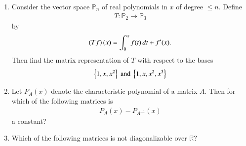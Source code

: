 \renewcommand{\theequation}{\theenumi}
\renewcommand{\thefigure}{\theenumi}
\begin{enumerate}[label=\thesection.\arabic*.,ref=\thesection.\theenumi]


\item Consider the vector space $\mathbb{P}_n$  of real polynomials in $x$ of degree  $\le n$. Define
\begin{align}
T: \mathbb{P}_2 \to \mathbb{P}_3
\end{align}
by
\begin{align}
\left(Tf\right)(x) = \int_{0}^{x}f(t)\,dt + f^{\prime}(x).
\end{align}
%
Then find the matrix representation of $T$ with respect to the bases
\begin{align}
\left\{1,x,x^2\right\} \text{ and } \left\{1,x,x^2,x^3\right\}
\end{align}
%
\item Let $P_A(x)$ denote the characteristic polynomial of a matrix $A$.  Then for which of the following matrices is
\begin{align}
P_A(x)-P_{A^{-1}}(x)
\end{align}
a constant?
\begin{enumerate}
\end{enumerate}
\item Which of the following matrices is not diagonalizable over $\mathbb{R}$?
\begin{enumerate}
\end{enumerate}
\end{enumerate}
